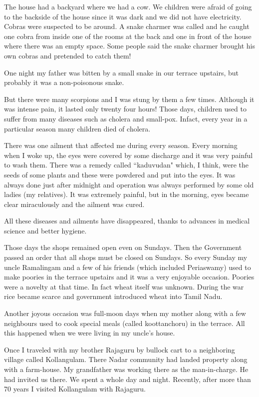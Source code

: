 The house had a backyard where we had a cow. We children were afraid of 
going to the backside of the house since it was dark and we did not have 
electricity. Cobras were suspected to be around. A snake charmer was 
called and he caught one cobra from inside one of the rooms at the back 
and one in front of the house where there was an empty space. Some 
people said the snake charmer brought his own cobras and pretended to 
catch them!

One night my father was bitten by a small snake in our terrace upstairs, 
but probably it was a non-poisonous snake.

But there were many scorpions and I was stung by them a few times. 
Although it was intense pain, it lasted only twenty four hours! Those 
days, children used to suffer from many diseases such as cholera and 
small-pox. Infact, every year in a particular season many children died 
of cholera.
\smallskip

There was one ailment that affected me during every season. 
Every morning when I woke up, the eyes were covered by some discharge 
and it was very painful to wash them. There was a remedy called 
``kaduvudan" which, I think, were the seeds of some plants and these were 
powdered and put into the eyes. It was always done just after midnight 
and operation was always performed by some old ladies (my relatives). It 
was extremely painful, but in the morning, eyes became clear 
miraculously and the ailment was cured.
\smallskip

All these diseases and ailments have disappeared, thanks to advances in 
medical science and better hygiene.\smallskip
 
Those days the shops remained open even on Sundays. Then the Government 
passed an order that all shops must be closed on Sundays. So every 
Sunday my uncle Ramalingam and a few of his friends (which included 
Periaswamy) used to make poories in the terrace upstairs and it was a 
very enjoyable occasion. Poories were a novelty at that time. In fact 
wheat itself was unknown. During the war rice became scarce and 
government introduced wheat into Tamil Nadu.
\smallskip

Another joyous occasion was full-moon days when my mother along with a 
few neighbours used to cook special meals (called koottanchoru) in the 
terrace. All this happened when we were living in my uncle's house.
 
Once I traveled with my brother Rajaguru by bullock cart to a 
neighboring village called Kollangulam. There Nadar community had landed 
property along with a farm-house. My grandfather was working there as 
the man-in-charge. He had invited us there. We spent a whole day and 
night. Recently, after more than 70 years I visited Kollangulam with 
Rajaguru.

